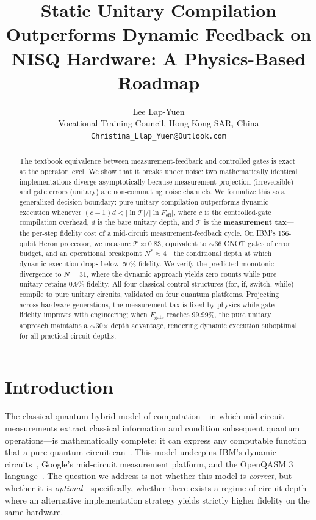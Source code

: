 \documentclass[11pt]{article}
\title{Static Unitary Compilation Outperforms Dynamic Feedback on NISQ Hardware: A Physics-Based Roadmap}
\author{
  Lee Lap-Yuen\\
  Vocational Training Council, Hong Kong SAR, China\\
  \texttt{Christina\_Llap\_Yuen@Outlook.com}
}
\date{}
\begin{document}
\maketitle

\begin{abstract}
The textbook equivalence between measurement-feedback and controlled gates is exact at the operator level.
We show that it breaks under noise: two mathematically identical implementations diverge asymptotically because measurement projection (irreversible) and gate errors (unitary) are non-commuting noise channels.
We formalize this as a generalized decision boundary: pure unitary compilation outperforms dynamic execution whenever $(c{-}1)d < |\ln \mathcal{T}|/|\ln F_{\text{eff}}|$, where $c$ is the controlled-gate compilation overhead, $d$ is the bare unitary depth, and $\mathcal{T}$ is the \textbf{measurement tax}---the per-step fidelity cost of a mid-circuit measurement-feedback cycle.
On IBM's 156-qubit Heron processor, we measure $\mathcal{T} \approx 0.83$, equivalent to $\sim$36 CNOT gates of error budget, and an operational breakpoint $N^* \approx 4$---the conditional depth at which dynamic execution drops below~50\% fidelity.
We verify the predicted monotonic divergence to $N = 31$, where the dynamic approach yields zero counts while pure unitary retains 0.9\% fidelity.
All four classical control structures (for, if, switch, while) compile to pure unitary circuits, validated on four quantum platforms.
Projecting across hardware generations, the measurement tax is fixed by physics while gate fidelity improves with engineering; when $F_{\text{gate}}$ reaches 99.99\%, the pure unitary approach maintains a $\sim$30$\times$ depth advantage, rendering dynamic execution suboptimal for all practical circuit depths.
\end{abstract}

\section{Introduction}

The classical-quantum hybrid model of computation---in which mid-circuit measurements extract classical information and condition subsequent quantum operations---is mathematically complete: it can express any computable function that a pure quantum circuit can~\cite{deutsch1985}.
This model underpins IBM's dynamic circuits~\cite{ibm_dynamic,ibm_blog2025}, Google's mid-circuit measurement platform, and the OpenQASM 3 language~\cite{openqasm3}.
The question we address is not whether this model is \emph{correct}, but whether it is \emph{optimal}---specifically, whether there exists a regime of circuit depth where an alternative implementation strategy yields strictly higher fidelity on the same hardware.
\end{document}
